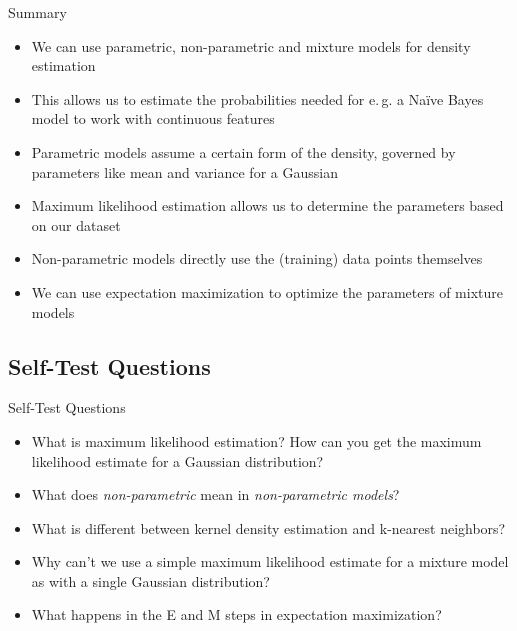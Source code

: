 \begin{frame}{Summary}{}
	\begin{itemize}
		\item We can use parametric, non-parametric and mixture models for density estimation
		\item This allows us to estimate the probabilities needed for e.\,g. a Na\"ive Bayes model to work with continuous features
		\item Parametric models assume a certain form of the density, governed by parameters like mean and variance for a Gaussian
		\item Maximum likelihood estimation allows us to determine the parameters based on our dataset
		\item Non-parametric models directly use the (training) data points themselves
		\item We can use expectation maximization to optimize the parameters of mixture models
	\end{itemize}
\end{frame}


\subsection{Self-Test Questions}

\begin{frame}{Self-Test Questions}{}\important
	\begin{itemize}
		\item What is maximum likelihood estimation? How can you get the maximum likelihood estimate for a Gaussian distribution?
		\item What does \textit{non-parametric} mean in \textit{non-parametric models}?
		\item What is different between kernel density estimation and k-nearest neighbors?
		\item Why can't we use a simple maximum likelihood estimate for a mixture model as with a single Gaussian distribution?
		\item What happens in the E and M steps in expectation maximization?
	\end{itemize}
\end{frame}


